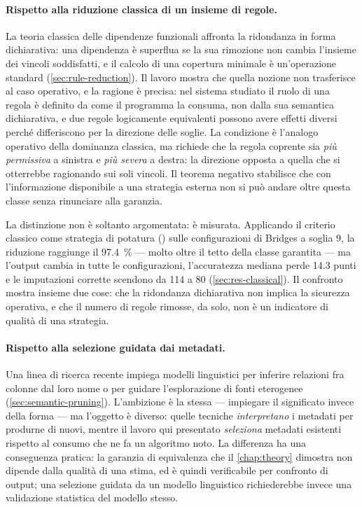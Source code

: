 \paragraph{Rispetto alla riduzione classica di un insieme di regole.} La teoria classica delle
dipendenze funzionali affronta la ridondanza in forma dichiarativa: una dipendenza è superflua se
la sua rimozione non cambia l'insieme dei vincoli soddisfatti, e il calcolo di una copertura
minimale è un'operazione standard (\autoref{sec:rule-reduction}). Il lavoro mostra che quella
nozione non trasferisce al caso operativo, e la ragione è precisa: nel sistema studiato il ruolo di
una regola è definito da come il programma la consuma, non dalla sua semantica dichiarativa, e due
regole logicamente equivalenti possono avere effetti diversi perché differiscono per la direzione
delle soglie. La condizione \Vtwo{} è l'analogo operativo della dominanza classica, ma richiede
che la regola coprente sia \emph{più permissiva} a sinistra e \emph{più severa} a destra: la
direzione opposta a quella che si otterrebbe ragionando sui soli vincoli. Il teorema negativo
stabilisce che con l'informazione disponibile a una strategia esterna non si può andare oltre
questa classe senza rinunciare alla garanzia.

La distinzione non è soltanto argomentata: è misurata. Applicando il criterio classico come
strategia di potatura () sulle configurazioni di Bridges a soglia 9, la
riduzione raggiunge il \SI{97.4}{\percent} --- molto oltre il tetto della classe garantita --- ma
l'output cambia in tutte le configurazioni, l'accuratezza mediana perde \num{14.3} punti e le
imputazioni corrette scendono da \num{114} a \num{80} (\autoref{sec:res-classical}). Il confronto
mostra insieme due cose: che la ridondanza dichiarativa non implica la sicurezza operativa, e che
il numero di regole rimosse, da solo, non è un indicatore di qualità di una strategia.

\paragraph{Rispetto alla selezione guidata dai metadati.} Una linea di ricerca recente impiega
modelli linguistici per inferire relazioni fra colonne dal loro nome o per guidare
l'esplorazione di fonti eterogenee (\autoref{sec:semantic-pruning}). L'ambizione è la stessa ---
impiegare il significato invece della forma --- ma l'oggetto è diverso: quelle tecniche
\emph{interpretano} i metadati per produrne di nuovi, mentre il lavoro qui presentato
\emph{seleziona} metadati esistenti rispetto al consumo che ne fa un algoritmo noto. La differenza
ha una conseguenza pratica: la garanzia di equivalenza che il \autoref{chap:theory} dimostra non
dipende dalla qualità di una stima, ed è quindi verificabile per confronto di output; una
selezione guidata da un modello linguistico richiederebbe invece una validazione statistica del
modello stesso.

